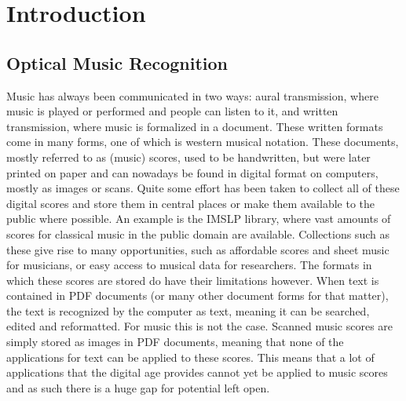\chapter{Introduction}\label{chap:introduction}

\section{Optical Music Recognition}\label{sec:introduction-OMR}
Music has always been communicated in two ways: aural transmission, where music is played or performed and people can listen to it, and written transmission, where music is formalized in a document. These written formats come in many forms, one of which is western musical notation. These documents, mostly referred to as (music) scores, used to be handwritten, but were later printed on paper and can nowadays be found in digital format on computers, mostly as images or scans. Quite some effort has been taken to collect all of these digital scores and store them in central places or make them available to the public where possible. An example is the IMSLP library, where vast amounts of scores for classical music in the public domain are available. Collections such as these give rise to many opportunities, such as affordable scores and sheet music for musicians, or easy access to musical data for researchers. The formats in which these scores are stored do have their limitations however. When text is contained in PDF documents (or many other document forms for that matter), the text is recognized by the computer as text, meaning it can be searched, edited and reformatted. For music this is not the case. Scanned music scores are simply stored as images in PDF documents, meaning that none of the applications for text can be applied to these scores. This means that a lot of applications that the digital age provides cannot yet be applied to music scores and as such there is a huge gap for potential left open.

